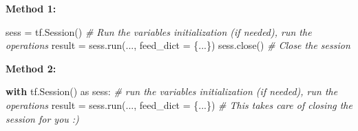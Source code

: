 \documentclass[11pt]{article}
\newenvironment{Shaded}{}{}
\newcommand{\CommentTok}[1]{\textcolor[rgb]{0.38,0.63,0.69}{\textit{{#1}}}}
\newcommand{\NormalTok}[1]{{#1}}
\newcommand{\ImportTok}[1]{{#1}}
\newcommand{\ControlFlowTok}[1]{\textcolor[rgb]{0.00,0.44,0.13}{\textbf{{#1}}}}
\newcommand{\OperatorTok}[1]{\textcolor[rgb]{0.40,0.40,0.40}{{#1}}}
\begin{document}
\textbf{Method 1:}

\begin{Shaded}
\begin{Highlighting}[]
\NormalTok{sess }\OperatorTok{=}\NormalTok{ tf.Session()}
\CommentTok{# Run the variables initialization (if needed), run the operations}
\NormalTok{result }\OperatorTok{=}\NormalTok{ sess.run(..., feed_dict }\OperatorTok{=}\NormalTok{ \{...\})}
\NormalTok{sess.close() }\CommentTok{# Close the session}
\end{Highlighting}
\end{Shaded}

\textbf{Method 2:}

\begin{Shaded}
\begin{Highlighting}[]
\ControlFlowTok{with}\NormalTok{ tf.Session() }\ImportTok{as}\NormalTok{ sess: }
    \CommentTok{# run the variables initialization (if needed), run the operations}
\NormalTok{    result }\OperatorTok{=}\NormalTok{ sess.run(..., feed_dict }\OperatorTok{=}\NormalTok{ \{...\})}
    \CommentTok{# This takes care of closing the session for you :)}
\end{Highlighting}
\end{Shaded}
\end{document}
